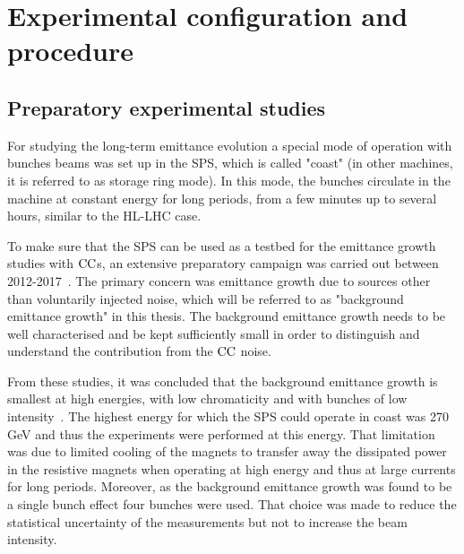 \section{Experimental configuration and procedure}\label{sec:exp_setup_2018}

\subsection{Preparatory experimental studies}\label{sec:preparatory_studies_for_2018_MD}
For studying the long-term emittance evolution a special mode of operation with bunches beams was set up in the SPS, which is called "coast" (in other machines, it is referred to as storage ring mode). In this mode, the bunches circulate in the machine at constant energy for long periods, from a few minutes up to several hours, similar to the HL-LHC case.\setlength{\parskip}{2ex} %

To make sure that the SPS can be used as a testbed for the emittance growth studies with ${\mathrm{CC}}$s, an extensive preparatory campaign was carried out between 2012-2017~\cite{Calaga:1451286, Alekou_CC_coast_prep_2016, Antoniou:2649815}. The primary concern was emittance growth due to sources other than voluntarily injected noise, which will be referred to as "background emittance growth" in this thesis. The background emittance growth needs to be well characterised and be kept sufficiently small in order to distinguish and understand the contribution from the ${\mathrm{CC}}$ noise. 

From these studies, it was concluded that the background emittance growth is smallest at high energies, with low chromaticity and with bunches of low intensity~\cite{Antoniou:2649815}. The highest energy for which the SPS could operate in coast was 270\,GeV and thus the experiments were performed at this energy.  That limitation was due to limited cooling of the magnets to transfer away the dissipated power in the resistive magnets when operating at high energy and thus at large currents for long periods. %
Moreover, as the background emittance growth was found to be a single bunch effect four bunches were used. That choice was made to reduce the statistical uncertainty of the measurements but not to increase the beam intensity.


